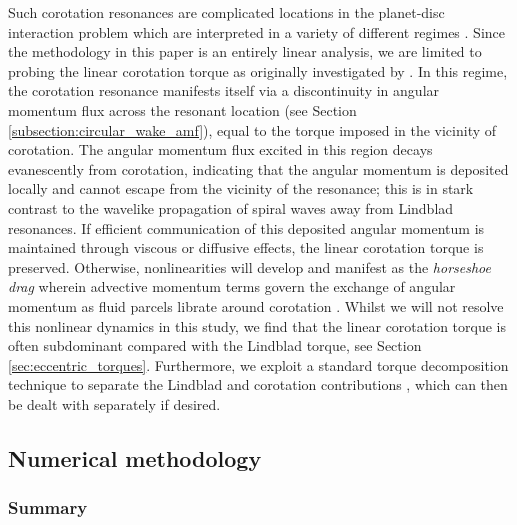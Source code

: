Such corotation resonances are complicated locations in the planet-disc interaction problem which are interpreted in a variety of different regimes \citep[e.g.][]{GoldreichTremaine_1979, Ward_1991, PaardekooperPapaloizou_2009}. Since the methodology in this paper is an entirely linear analysis, we are limited to probing the linear corotation torque as originally investigated by \cite{GoldreichTremaine_1979}. In this regime, the corotation resonance manifests itself via a discontinuity in angular momentum flux across the resonant location (see Section \ref{subsection:circular_wake_amf}), equal to the torque imposed in the vicinity of corotation. The angular momentum flux excited in this region decays evanescently from corotation, indicating that the angular momentum is deposited locally and cannot escape from the vicinity of the resonance; this is in stark contrast to the wavelike propagation of spiral waves away from Lindblad resonances. If efficient communication of this deposited angular momentum is maintained through viscous or diffusive effects, the linear corotation torque \citep{PaardekooperEtAl_2011} is preserved. Otherwise, nonlinearities will develop and manifest as the \textit{horseshoe drag} wherein advective momentum terms govern the exchange of angular momentum as fluid parcels librate around corotation \citep[e.g.][]{Ward_1991,PaardekooperEtAl_2010}. Whilst we will not resolve this nonlinear dynamics in this study, we find that the linear corotation torque is often subdominant compared with the Lindblad torque, see Section \ref{sec:eccentric_torques}. Furthermore, we exploit a standard torque decomposition technique to separate the Lindblad and corotation contributions \citep[see e.g.][]{MirandaRafikov_2020}, which can then be dealt with separately if desired.

\subsection{Numerical methodology}
\label{subsection:numerical}

\subsubsection{Summary}

